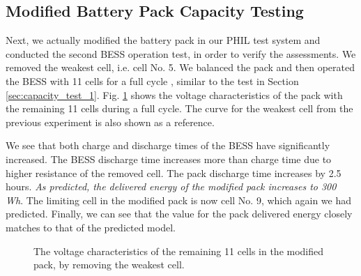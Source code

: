 \documentclass[10pt,twocolumn]{IEEEtran}
\begin{document}
\subsection{Modified  Battery Pack Capacity Testing}
Next, we actually modified the  battery pack in our PHIL test system and  conducted the second BESS operation test, in order to verify the assessments.
We removed the weakest cell, i.e. cell No. 5. 
We balanced the pack and then operated the BESS with 11 cells for a full cycle , similar to the test in   Section \ref{sec:capacity_test_1}.
Fig.  \ref{fig:cell_removal3} shows the voltage characteristics of the pack with the remaining 11 cells during a full cycle.
The curve for the weakest cell from the previous experiment is also shown as a reference.

We  see that both charge and discharge times of the BESS have significantly increased. 
The BESS discharge time increases more than  charge time due to higher resistance of the removed cell.
The pack discharge time  increases by 2.5 hours.
\emph{As predicted,  the delivered energy of the modified pack increases to 300 Wh}.
The limiting cell in the modified pack is now cell No. 9, which again we had predicted.  
Finally, we can see that the value for the pack delivered energy closely matches  to that of the predicted model.

\begin{figure}
\centering
\vspace{-0.4cm}
{} \vspace{-0.3cm}
\caption{The voltage characteristics of the remaining 11 cells in the modified pack,  by removing the weakest cell. }
\vspace{-0.3cm}
\label{fig:cell_removal3}
\end{figure} 
\end{document}
